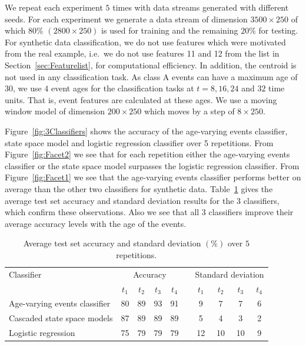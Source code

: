 \documentclass[a4paper,11pt]{article}
\begin{document}
We repeat each experiment $5$ times with data streams generated with different seeds. For each experiment we generate a data stream of dimension $3500 \times 250$ of which $80\%$ $(2800 \times 250)$ is used for training and the remaining $20\%$ for testing. For synthetic data classification, we do not use features which were motivated from the real example, i.e.\ we do not use features 11 and 12 from the list in Section~\ref{sec:Featurelist}, for computational efficiency. In addition, the centroid is not used in any classification task. As class A events can have a maximum age of $30$, we use $4$ event ages for the classification tasks at $t = 8, 16, 24$ and $32$ time units. That is, event features are calculated at these ages. We use a moving window model of dimension $200 \times 250$ which moves by a step of $8 \times 250$.

Figure~\ref{fig:3Classifiers} shows the accuracy of the age-varying events classifier, state space model and logistic regression classifier over 5 repetitions. From Figure~\ref{fig:Facet2} we see that for each repetition either the age-varying events classifier or the state space model surpasses the logistic regression classifier. From Figure~\ref{fig:Facet1} we see that the age-varying events classifier performs better on average than the other two classifiers for synthetic data. Table~\ref{tab:Results_Synthetic} gives the average test set accuracy and standard deviation results for the 3 classifiers, which confirm these observations. Also we see that all 3 classifiers improve their average accuracy levels with the age of the events.

\begin{table}[!ht]
  \centering
  \begin{tabular}{lccccccccc}
    \toprule
    Classifier                   & \multicolumn{4}{c}{Accuracy} & & \multicolumn{4}{c}{Standard deviation} \\
    \cmidrule{2-5} \cmidrule{7-10}
                                 & $t_1$ & $t_2$ & $t_3$ & $t_4$   & & $t_1$ & $t_2$ & $t_3$ & $t_4$\\
    \midrule
    Age-varying events classifier & 80    & 89    & 93    & 91  &  & 9  & 7  &  7  & 6 \\
    Cascaded state space models  & 87    & 89    & 89    & 89   & & 5  & 4  &  3  & 2\\
    Logistic regression          & 75    & 79    & 79    & 79   & & 12  & 10 & 10 & 9 \\
    \bottomrule
  \end{tabular}
    \caption{Average test set accuracy and standard deviation $(\%)$ over $5$ repetitions.}\label{tab:Results_Synthetic}
\end{table}
\end{document}
